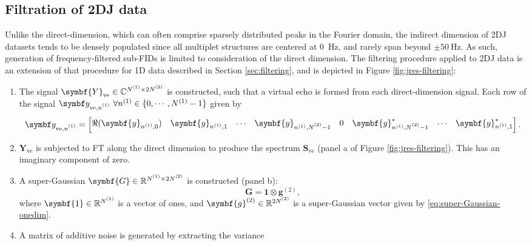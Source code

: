 \subsection{Filtration of \ac{2DJ} data}
Unlike the direct-dimension, which can often comprise sparsely distributed
peaks in the Fourier domain, the indirect dimension of \ac{2DJ} datasets tends
to be densely populated since all multiplet structures are centered at
\qty{0}{\hertz}, and rarely span beyond $\pm \qty{50}{\hertz}$. As such,
generation of frequency-filtered sub-\acp{FID} is limited to consideration of
the direct dimension.
The filtering procedure applied to \ac{2DJ} data is an extension of that
procedure for \ac{1D} data described in Section \ref{sec:filtering}, and is
depicted in Figure \ref{fig:jres-filtering}:
\begin{enumerate}
    \item The signal $\symbf{Y}_{\text{ve}} \in \mathbb{C}^{\None \times 2 \Ntwo}$ is
    constructed, such that a virtual echo is formed from each direct-dimension
    signal. Each row of the signal $\by_{\text{ve},\none}\ \forall n^{(1)} \in
    \lbrace 0, \cdots, N^{(1)} - 1 \rbrace$ given by
    \begin{equation}
        \by_{\text{ve},\none} =
            \begin{bmatrix}
                \Re(\symbf{y}_{n^{(1)}, 0}) &
                \symbf{y}_{n^{(1)}, 1} &
                \cdots &
                \symbf{y}_{n^{(1)}, \Ntwo - 1} &
                0 &
                \symbf{y}_{n^{(1)}, \Ntwo - 1}^* &
                \cdots &
                \symbf{y}_{n^{(1)}, 1}^*
            \end{bmatrix}.
    \end{equation}
    \item $\symbf{Y}_{\text{ve}}$ is subjected to \ac{FT} along the direct
        dimension to produce the spectrum  $\symbf{S}_{\text{ve}}$ (panel a of
        Figure \ref{fig:jres-filtering}). This has an imaginary component of
        zero.
    \item A super-Gaussian $\symbf{G} \in \mathbb{R}^{\None \times 2 \Ntwo}$ is
        constructed (panel b):
        \begin{equation}
            \symbf{G} = \symbf{1} \otimes \symbf{g}^{(2)},
        \end{equation}
        where $\symbf{1} \in \mathbb{R}^{\None}$ is a vector of ones, and
        $\symbf{g}^{(2)} \in \mathbb{R}^{2\Ntwo}$ is a super-Gaussian vector
        given by \eqref{eq:super-Gaussian-onedim}.
    \item A matrix of additive noise is generated by extracting the variance

\end{enumerate}
